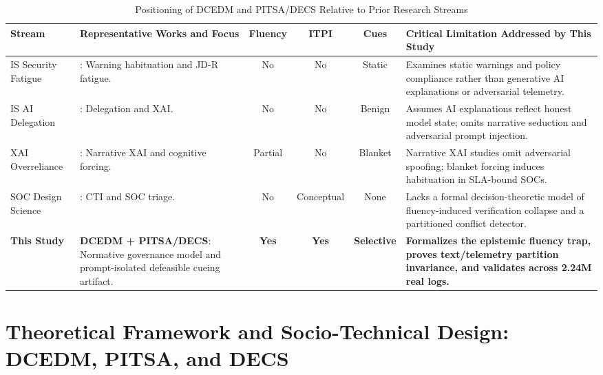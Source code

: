 \documentclass[11pt,a4paper]{article}
\begin{document}
\begin{table}[!htbp]
\centering
\singlespacing
\caption{Positioning of DCEDM and PITSA/DECS Relative to Prior Research Streams}
\label{tab:lit_matrix}
\footnotesize
\setlength{\tabcolsep}{3.2pt}
\begin{tabular}{l L{3.3cm} c c c L{3.8cm}}
\toprule
\textbf{Stream} & \textbf{Representative Works and Focus} & \textbf{Fluency} & \textbf{ITPI} & \textbf{Cues} & \textbf{Critical Limitation Addressed by This Study} \\
\midrule
IS Security Fatigue & \citet{anderson2016warning, vance2018fog, cram2021technostress, jensen2022improving, hsu2024proactive}: Warning habituation and JD-R fatigue. & No & No & Static & Examines static warnings and policy compliance rather than generative AI explanations or adversarial telemetry. \\
\addlinespace[2pt]
IS AI Delegation & \citet{baird2021next, fugener2022cognitive, lebovitz2022engage, revilla2023human, tutun2024explainable, ansari2026partner, taudien2026effect}: Delegation and XAI. & No & No & Benign & Assumes AI explanations reflect honest model state; omits narrative seduction and adversarial prompt injection. \\
\addlinespace[2pt]
XAI Overreliance & \citet{burton2020systematic, bucinca2021trust, vasconcelos2023explanations, bag2025enhancing}: Narrative XAI and cognitive forcing. & Partial & No & Blanket & Narrative XAI studies omit adversarial spoofing; blanket forcing induces habituation in SLA-bound SOCs. \\
\addlinespace[2pt]
SOC Design Science & \citet{ebrahimi2020semi, li2022assessing, ampel2024improving, tilbury2024automation, srinivas2025ai, bartal2026alert}: CTI and SOC triage. & No & Conceptual & None & Lacks a formal decision-theoretic model of fluency-induced verification collapse and a partitioned conflict detector. \\
\addlinespace[2pt]
\textbf{This Study} & \textbf{DCEDM + PITSA/DECS}: Normative governance model and prompt-isolated defeasible cueing artifact. & \textbf{Yes} & \textbf{Yes} & \textbf{Selective} & \textbf{Formalizes the epistemic fluency trap, proves text/telemetry partition invariance, and validates across 2.24M real logs.} \\
\bottomrule
\end{tabular}
\end{table}

\section{Theoretical Framework and Socio-Technical Design: DCEDM, PITSA, and DECS}
\label{sec:theory}
\end{document}
